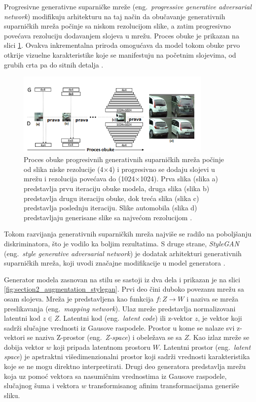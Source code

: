 \documentclass[12pt,oneside]{memoir}
\begin{document}
Progresivne generativne suparničke mreže (eng.~\textit{progressive generative adversarial network}) modifikuju arhitekturu na taj način da obučavanje generativnih suparničkih mreža počinje sa niskom rezolucijom slike, a zatim progresivno povećava rezoluciju dodavanjem slojeva u mrežu. Proces obuke je prikazan na slici \ref{fig:section2_augmentation_progressivegans}.
Ovakva inkrementalna priroda omogućava da model tokom obuke prvo otkrije vizuelne karakteristike koje se manifestuju na početnim slojevima, od grubih crta pa do sitnih detalja \cite{karras2017progressive}.


\begin{figure}[ht]
    \centering
    \includegraphics[width=0.85\textwidth]{matfmaster/glava2/progressive_gan.png}
    \caption{Proces obuke progresivnih generativnih suparničkih mreža počinje od slika niske rezolucije (4\(\times\)4) i progresivno se dodaju slojevi u mrežu i rezolucija povećava do (1024\(\times\)1024). Prva slika (slika a) predstavlja prvu iteraciju obuke modela, druga slika (slika b) predstavlja drugu iteraciju obuke, dok treća slika (slika c) predstavlja poslednju iteraciju. Slike automobila (slika d) predstavljaju generisane slike sa najvećom rezolucijom \cite{karras2017progressive}. }
    \label{fig:section2_augmentation_progressivegans}
\end{figure}

\clearpage
Tokom razvijanja generativnih suparničkih mreža najviše se radilo na poboljšanju diskriminatora, što je vodilo ka boljim rezultatima. S druge strane, \textit{StyleGAN} (eng.~\textit{style generative adversarial network}) je dodatak arhitekturi generativnih suparničkih mreža, koji uvodi značajne modifikacije u model generatora \cite{karras2019style}. 

Generator modela zasnovan na stilu se sastoji iz dva dela i prikazan je na slici \ref{fig:section2_augmentation_stylegan}. 
Prvi deo čini duboko povezanu mrežu sa osam slojeva. Mreža je predstavljena kao funkcija \(f: Z\to W\) i naziva se mreža preslikavanja (eng.~\textit{mapping network}). Ulaz mreže predstavlja normalizovani latentni kod \(z \in Z\). Latentni kod (eng.~\textit{latent code}) ili z-vektor \(z\), je vektor koji sadrži slučajne vrednosti iz Gausove raspodele. Prostor u kome se nalaze svi z-vektori se naziva Z-prostor (eng.~\textit{Z-space}) i obeležava se sa \(Z\). Kao izlaz mreže se dobija vektor \(w\) koji pripada latentnom prostoru \(W\). Latentni prostor (eng.~\textit{latent space}) je apstraktni višedimenzionalni prostor koji sadrži vrednosti karakteristika koje se ne mogu direktno interpretirati.
Drugi deo generatora predstavlja mrežu koja uz pomoć vektora sa nasumičnim vrednostima iz Gausove raspodele, slučajnog šuma i vektora \(w\) transformisanog afinim transformacijama generiše sliku. 
\end{document}
